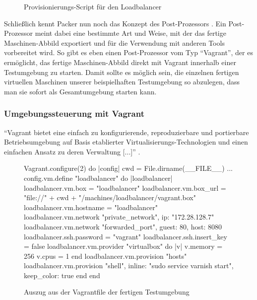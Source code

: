 \begin{figure}[!ht]
  \begin{center}
    \caption{Provisionierungs-Script für den Loadbalancer}
    \label{Loadbalancer-Install}
  \end{center}
\end{figure}

Schließlich kennt Packer nun noch das Konzept des Post-Prozessors \citep[Vgl.][]{Packer:003}. Ein Post-Prozessor meint dabei eine bestimmte Art und Weise, mit der das fertige Maschinen-Abbild exportiert und für die Verwendung mit anderen Tools vorbereitet wird. So gibt es eben einen Post-Prozessor vom Typ "`Vagrant"', der es ermöglicht, das fertige Maschinen-Abbild direkt mit Vagrant innerhalb einer Testumgebung zu starten. Damit sollte es möglich sein, die einzelnen fertigen virtuellen Maschinen unserer beispielhaften Testumgebung so abzulegen, dass man sie sofort als Gesamtumgebung starten kann.

\subsubsection{Umgebungssteuerung mit Vagrant}

"`Vagrant bietet eine einfach zu konfigurierende, reproduzierbare und portierbare Betriebsumgebung auf Basis etablierter Virtualisierungs-Technologien und einen einfachen Ansatz zu deren Verwaltung [...]"' \citep[Siehe][]{Vagrant:001}.

\begin{figure}[!ht]
  \begin{center}
    \begin{rubycode}
Vagrant.configure(2) do |config|
    cwd = File.dirname(__FILE__)
    ...
    config.vm.define "loadbalancer" do |loadbalancer|
        loadbalancer.vm.box = "loadbalancer"     
        loadbalancer.vm.box_url = "file://"
            + cwd + "/machines/loadbalancer/vagrant.box"
        loadbalancer.vm.hostname = "loadbalancer"
        loadbalancer.vm.network "private_network", ip: "172.28.128.7"
        loadbalancer.vm.network "forwarded_port", guest: 80, host: 8080
        loadbalancer.ssh.password = "vagrant"
        loadbalancer.ssh.insert_key = false
        loadbalancer.vm.provider "virtualbox" do |v|
            v.memory = 256
            v.cpus = 1
        end
        loadbalancer.vm.provision "hosts"
        loadbalancer.vm.provision "shell",
            inline: "sudo service varnish start",
            keep_color: true
    end
end
    \end{rubycode}
    \caption{Auszug aus der Vagrantfile der fertigen Testumgebung}
    \label{Vagrantfile}
  \end{center}
\end{figure}


